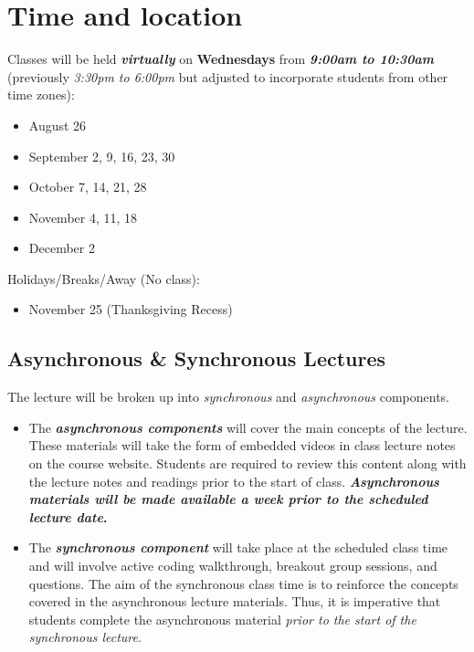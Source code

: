 \documentclass[
  12pt,
]{article}
\providecommand{\tightlist}{%
  \setlength{\itemsep}{0pt}\setlength{\parskip}{0pt}}
\begin{document}
\hypertarget{time-and-location}{%
\section{Time and location}\label{time-and-location}}

Classes will be held \textbf{\emph{virtually}} on \textbf{Wednesdays}
from \textbf{\emph{9:00am to 10:30am}} (previously \emph{3:30pm to
6:00pm} but adjusted to incorporate students from other time zones):

\begin{itemize}
\tightlist
\item
  August 26
\item
  September 2, 9, 16, 23, 30
\item
  October 7, 14, 21, 28
\item
  November 4, 11, 18
\item
  December 2
\end{itemize}

Holidays/Breaks/Away (No class):

\begin{itemize}
\tightlist
\item
  November 25 (Thanksgiving Recess)
\end{itemize}

\hypertarget{asynchronous-synchronous-lectures}{%
\subsection{Asynchronous \& Synchronous
Lectures}\label{asynchronous-synchronous-lectures}}

The lecture will be broken up into \emph{synchronous} and
\emph{asynchronous} components.

\begin{itemize}
\tightlist
\item
  The \textbf{\emph{asynchronous components}} will cover the main
  concepts of the lecture. These materials will take the form of
  embedded videos in class lecture notes on the course website. Students
  are required to review this content along with the lecture notes and
  readings prior to the start of class. \textbf{\emph{Asynchronous
  materials will be made available a \textbf{week prior} to the
  scheduled lecture date}.}
\item
  The \textbf{\emph{synchronous component}} will take place at the
  scheduled class time and will involve active coding walkthrough,
  breakout group sessions, and questions. The aim of the synchronous
  class time is to reinforce the concepts covered in the asynchronous
  lecture materials. Thus, it is imperative that students complete the
  asynchronous material \emph{prior to the start of the synchronous
  lecture}.
\end{itemize}
\end{document}
